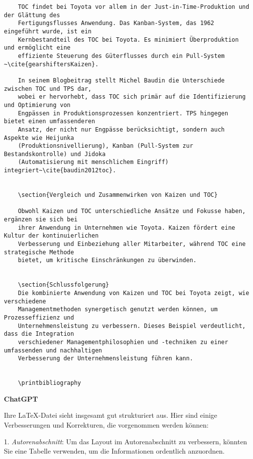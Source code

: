 \begin{verbatim}
	TOC findet bei Toyota vor allem in der Just-in-Time-Produktion und der Glättung des
	Fertigungsflusses Anwendung. Das Kanban-System, das 1962 eingeführt wurde, ist ein
	Kernbestandteil des TOC bei Toyota. Es minimiert Überproduktion und ermöglicht eine
	effiziente Steuerung des Güterflusses durch ein Pull-System​~\cite{gearshiftersKaizen}.
	
	In seinem Blogbeitrag stellt Michel Baudin die Unterschiede zwischen TOC und TPS dar,
	wobei er hervorhebt, dass TOC sich primär auf die Identifizierung und Optimierung von 
	Engpässen in Produktionsprozessen konzentriert. TPS hingegen bietet einen umfassenderen
	Ansatz, der nicht nur Engpässe berücksichtigt, sondern auch Aspekte wie Heijunka 
	(Produktionsnivellierung), Kanban (Pull-System zur Bestandskontrolle) und Jidoka
	(Automatisierung mit menschlichem Eingriff) integriert~\cite{baudin2012toc}.
	
	
	\section{Vergleich und Zusammenwirken von Kaizen und TOC}
	
	Obwohl Kaizen und TOC unterschiedliche Ansätze und Fokusse haben, ergänzen sie sich bei
	ihrer Anwendung in Unternehmen wie Toyota. Kaizen fördert eine Kultur der kontinuierlichen
	Verbesserung und Einbeziehung aller Mitarbeiter, während TOC eine strategische Methode
	bietet, um kritische Einschränkungen zu überwinden.
	
	
	\section{Schlussfolgerung}
	Die kombinierte Anwendung von Kaizen und TOC bei Toyota zeigt, wie verschiedene 
	Managementmethoden synergetisch genutzt werden können, um Prozesseffizienz und 
	Unternehmensleistung zu verbessern. Dieses Beispiel verdeutlicht, dass die Integration 
	verschiedener Managementphilosophien und -techniken zu einer umfassenden und nachhaltigen 
	Verbesserung der Unternehmensleistung führen kann.
	
	
	\printbibliography

\end{verbatim}

\textbf{ChatGPT}

Ihre LaTeX-Datei sieht insgesamt gut strukturiert aus. Hier sind einige Verbesserungen und Korrekturen, die vorgenommen werden können:

1. \textit{Autorenabschnitt}: Um das Layout im Autorenabschnitt zu verbessern, könnten Sie eine Tabelle verwenden, um die Informationen ordentlich anzuordnen.

